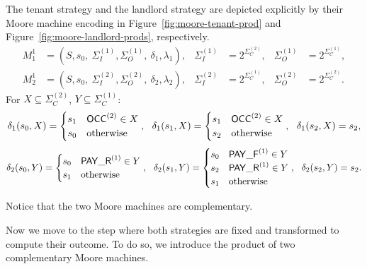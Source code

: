 \begin{example}
  The tenant strategy and the landlord strategy are depicted explicitly by their Moore machine encoding in Figure~\ref{fig:moore-tenant-prod} and Figure~\ref{fig:moore-landlord-prods}, respectively.
  \[
  \begin{aligned}
  M_1^1&=(S,s_0,\ \Sigma_I^{(1)},\Sigma_O^{(1)},\ \delta_1,\lambda_1),
  &\Sigma_I^{(1)}&=2^{\Sigma_C^{(2)}},& \Sigma_O^{(1)}&=2^{\Sigma_C^{(1)}},\\
  M_2^1&=(S,s_0,\ \Sigma_I^{(2)},\Sigma_O^{(2)},\ \delta_2,\lambda_2),
  &\Sigma_I^{(2)}&=2^{\Sigma_C^{(1)}},& \Sigma_O^{(2)}&=2^{\Sigma_C^{(2)}}.
  \end{aligned}
  \]
  For $X\subseteq\Sigma_C^{(2)}$, $Y\subseteq\Sigma_C^{(1)}$:
  \[
  \delta_1(s_0,X)=\begin{cases}s_1&\OCC^{(2)}\in X\\ s_0&\text{otherwise}\end{cases},\ \ 
  \delta_1(s_1,X)=\begin{cases}s_1&\OCC^{(2)}\in X\\ s_2&\text{otherwise}\end{cases},\ \ 
  \delta_1(s_2,X)=s_2,
  \]
  \[
  \delta_2(s_0,Y)=\begin{cases}s_0&\PAY^{(1)}\in Y\\ s_1&\text{otherwise}\end{cases},\ \ 
  \delta_2(s_1,Y)=\begin{cases}s_0&\PAYF^{(1)}\in Y\\ s_2&\PAY^{(1)}\in Y\\ s_1&\text{otherwise}\end{cases},\ \ 
  \delta_2(s_2,Y)=s_2.
  \]
  
  Notice that the two Moore machines are complementary.
  \end{example}
  
  Now we move to the step where both strategies are fixed and transformed to compute their outcome. To do so, we introduce the product of two complementary Moore machines.
  
